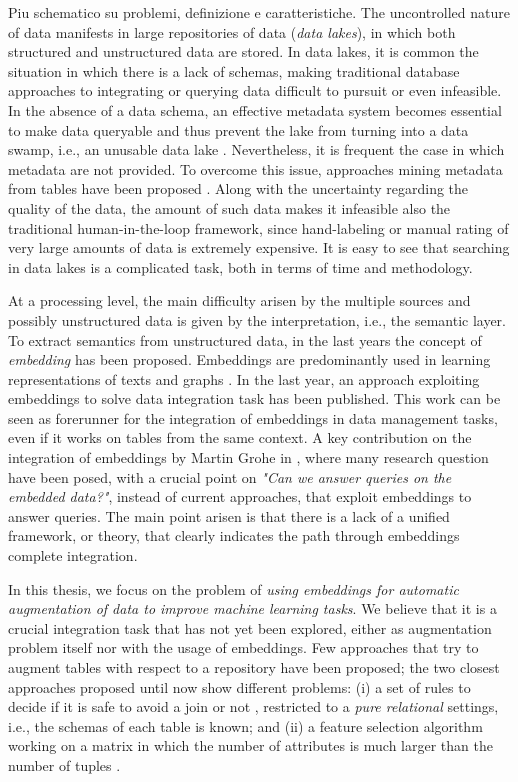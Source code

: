 {\color{red}Piu schematico su problemi, definizione e caratteristiche.}
The uncontrolled nature of data manifests in large repositories of data (\textit{data lakes}), in which both structured and unstructured data are stored. In data lakes, it is common the situation in which there is a lack of schemas, making traditional database approaches to integrating or querying data difficult to pursuit or even infeasible. In the absence of a data schema, an effective metadata system becomes essential to make data queryable and thus prevent the lake from turning into a data swamp, i.e., an unusable data lake \cite{walker2015personal,hai2016constance}. Nevertheless, it is frequent the case in which metadata are not provided. To overcome this issue, approaches mining metadata from tables have been proposed \cite{arocena2015ibench,suriarachchi2016crossing}.
Along with the uncertainty regarding the quality of the data, the amount of such data makes it infeasible also the traditional human-in-the-loop framework, since hand-labeling or manual rating of very large amounts of data is extremely expensive. It is easy to see that searching in data lakes is a complicated task, both in terms of time and methodology. 

At a processing level, the main difficulty arisen by the multiple sources and possibly unstructured data is given by the interpretation, i.e., the semantic layer. To extract semantics from unstructured data, in the last years the concept of \textit{embedding} has been proposed. Embeddings are predominantly used in learning representations of texts \cite{mikolov2013efficient} and graphs \cite{nickel2017poincare}. In the last year, an approach exploiting embeddings to solve data integration task \cite{cappuzzo2020creating} has been published. This work can be seen as forerunner for the integration of embeddings in data management tasks, even if it works on tables from the same context. A key contribution on the integration of embeddings by Martin Grohe in \cite{grohe2020word2vec}, where many research question have been posed, with a crucial point on \textit{"Can we answer queries on the embedded data?"}, instead of current approaches, that exploit embeddings to answer queries. The main point arisen is that there is a lack of a unified framework, or theory, that clearly indicates the path through embeddings complete integration. 


In this thesis, we focus on the problem of \textit{using embeddings for automatic augmentation of data to improve machine learning tasks}. We believe that it is a crucial integration task that has not yet been explored, either as augmentation problem itself nor with the usage of embeddings. Few approaches that try to augment tables with respect to a repository have been proposed; the two closest approaches proposed until now show different problems: (i) a set of rules to decide if it is safe to avoid a join or not \cite{kumar2016join}, restricted to a \textit{pure relational} settings, i.e., the schemas of each table is known; and (ii) a feature selection algorithm working on a matrix in which the number of attributes is much larger than the number of tuples \cite{chepurko2020arda}. 


